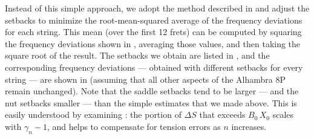 Instead of this simple approach, we adopt the method described in  and adjust the setbacks to minimize the root-mean-squared average of the frequency deviations for each string. This mean (over the first 12 frets) can be computed by squaring the frequency deviations shown in , averaging those values, and then taking the square root of the result. The setbacks we obtain are listed in , and the corresponding frequency deviations --- obtained with different setbacks for every string --- are shown in  (assuming that all other aspects of the Alhambra 8P remain unchanged). Note that the saddle setbacks tend to be larger --- and the nut setbacks smaller --- than the simple estimates that we made above. This is easily understood by examining : the portion of $\Delta S$ that exceeds $B_0\, X_0$ scales with $\gamma_n - 1$, and helps to compensate for tension errors as $n$ increases.

